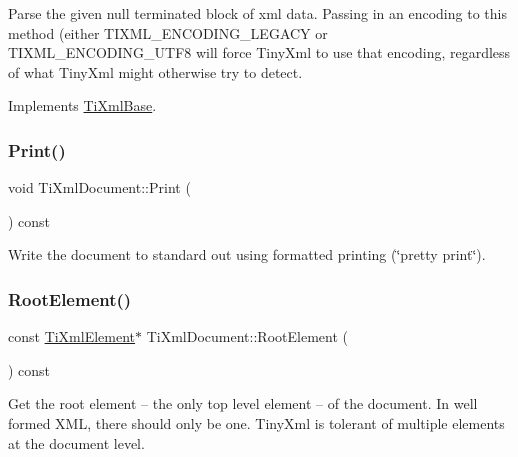 Parse the given null terminated block of xml data. Passing in an encoding to this method (either T\+I\+X\+M\+L\+\_\+\+E\+N\+C\+O\+D\+I\+N\+G\+\_\+\+L\+E\+G\+A\+CY or T\+I\+X\+M\+L\+\_\+\+E\+N\+C\+O\+D\+I\+N\+G\+\_\+\+U\+T\+F8 will force Tiny\+Xml to use that encoding, regardless of what Tiny\+Xml might otherwise try to detect. 

Implements \hyperlink{class_ti_xml_base}{Ti\+Xml\+Base}.

\hypertarget{class_ti_xml_document_aa4e8c1498a76dcde7191c683e1220882}{}\label{class_ti_xml_document_aa4e8c1498a76dcde7191c683e1220882} 
\subsubsection{\texorpdfstring{Print()}{Print()}}
{\footnotesize\ttfamily void Ti\+Xml\+Document\+::\+Print (\begin{DoxyParamCaption}{ }\end{DoxyParamCaption}) const\hspace{0.3cm}{\ttfamily [inline]}}

Write the document to standard out using formatted printing (\char`\"{}pretty print\char`\"{}). \hypertarget{class_ti_xml_document_ab54e3a93279fcf0ac80f06ed9c52f04a}{}\label{class_ti_xml_document_ab54e3a93279fcf0ac80f06ed9c52f04a} 
\subsubsection{\texorpdfstring{Root\+Element()}{RootElement()}}
{\footnotesize\ttfamily const \hyperlink{class_ti_xml_element}{Ti\+Xml\+Element}$\ast$ Ti\+Xml\+Document\+::\+Root\+Element (\begin{DoxyParamCaption}{ }\end{DoxyParamCaption}) const\hspace{0.3cm}{\ttfamily [inline]}}

Get the root element -- the only top level element -- of the document. In well formed X\+ML, there should only be one. Tiny\+Xml is tolerant of multiple elements at the document level. \hypertarget{class_ti_xml_document_a51dac56316f89b35bdb7d0d433ba988e}{}\label{class_ti_xml_document_a51dac56316f89b35bdb7d0d433ba988e} 
